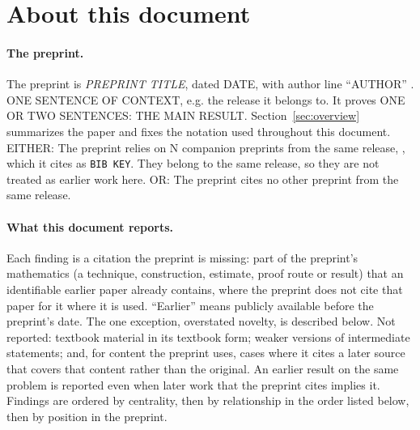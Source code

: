 \section{About this document}\label{sec:about}

\paragraph{The preprint.}
The preprint is \emph{{PREPRINT TITLE}}, dated {DATE}, with author line
``{AUTHOR}'' \cite{OAI-Preprint}. {ONE SENTENCE OF CONTEXT, e.g. the release it
belongs to.} It proves {ONE OR TWO SENTENCES: THE MAIN RESULT}.
Section~\ref{sec:overview} summarizes the paper and fixes the notation used
throughout this document. {EITHER: The preprint relies on {N} companion
preprints from the same release, \cite{OAI-Companion1}, which it cites as
\texttt{{BIB KEY}}. They belong to the same release, so they are not treated as
earlier work here. OR: The preprint cites no other preprint from the same
release.}

\paragraph{What this document reports.}
Each finding is a citation the preprint is missing: part of the preprint's
mathematics (a technique, construction, estimate, proof route or result) that
an identifiable earlier paper already contains, where the preprint does not
cite that paper for it where it is used. ``Earlier'' means publicly available
before the preprint's date. The one exception, overstated novelty, is
described below. Not reported: textbook material in its textbook form; weaker versions of
intermediate statements; and, for content the preprint uses, cases where it
cites a later source that covers that content rather than the original. An
earlier result on the same problem is reported even when later work that the
preprint cites implies it. Findings are ordered by centrality, then by relationship in
the order listed below, then by position in the preprint.

